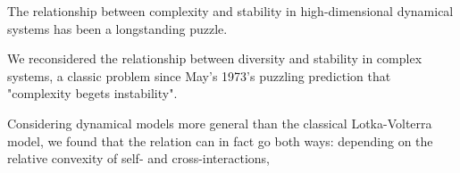 
The relationship between complexity and stability in high-dimensional dynamical systems has been a longstanding puzzle. 

We reconsidered the relationship between diversity and stability in complex systems, a classic problem since May's 1973's puzzling prediction that "complexity begets instability".

Considering dynamical models more general than the classical Lotka-Volterra model, we found that the relation can in fact go both ways:  depending on the relative convexity of self- and cross-interactions, 

